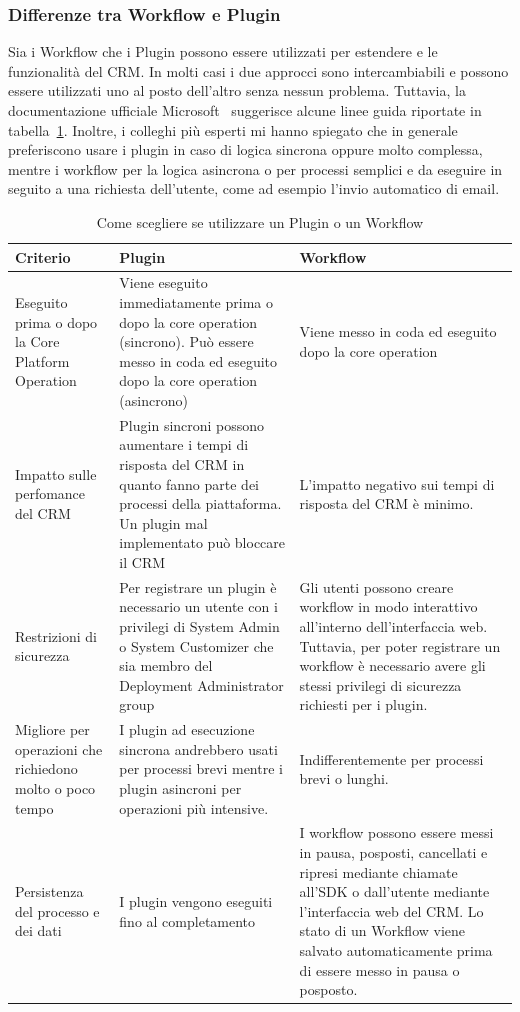 \subsubsection{Differenze tra Workflow e Plugin}
Sia i Workflow che i Plugin possono essere utilizzati per estendere e le funzionalità del CRM. In molti casi i due approcci sono intercambiabili e possono essere utilizzati uno al posto dell'altro senza nessun problema. 
Tuttavia, la documentazione ufficiale Microsoft~\cite{PluginVSWorkflow} suggerisce alcune linee guida riportate in tabella~\ref{table:pluginVsWorkflow}. Inoltre, i colleghi più esperti mi hanno spiegato che in generale preferiscono usare i plugin in caso di logica sincrona oppure molto complessa, mentre i workflow per la logica asincrona o per processi semplici e da eseguire in seguito a una richiesta dell'utente, come ad esempio l'invio automatico di email.

\begin{table}[ht]
  \centering
  \begin{tabular}{p{}p{}p{}}
    \toprule
      \textbf{Criterio} & \textbf{Plugin} & \textbf{Workflow} \\
    \midrule
    Eseguito prima o dopo la Core Platform Operation & Viene eseguito immediatamente prima o dopo la core operation (sincrono). Può essere messo in coda ed eseguito dopo la core operation (asincrono) & Viene messo in coda ed eseguito dopo la core operation \\
    \midrule
    Impatto sulle perfomance del CRM & Plugin sincroni possono aumentare i tempi di risposta del CRM in quanto fanno parte dei processi della piattaforma. Un plugin mal implementato può bloccare il CRM & L'impatto negativo sui tempi di risposta del CRM è minimo. \\
    \midrule
    Restrizioni di sicurezza & Per registrare un plugin è necessario un utente con i privilegi di System Admin o System Customizer che sia membro del Deployment Administrator group & Gli utenti possono creare workflow in modo interattivo all'interno dell'interfaccia web. Tuttavia, per poter registrare un workflow è necessario avere gli stessi privilegi di sicurezza richiesti per i plugin. \\
    \midrule
    Migliore per operazioni che richiedono molto o poco tempo & I plugin ad esecuzione sincrona andrebbero usati per processi brevi mentre i plugin asincroni per operazioni più intensive. & Indifferentemente per processi brevi o lunghi. \\
    \midrule
    Persistenza del processo e dei dati & I plugin vengono eseguiti fino al completamento & I workflow possono essere messi in pausa, posposti, cancellati e ripresi mediante chiamate all'SDK o dall'utente mediante l'interfaccia web del CRM. Lo stato di un Workflow viene salvato automaticamente prima di essere messo in pausa o posposto. \\
    \bottomrule
  \end{tabular}
  \caption{Come scegliere se utilizzare un Plugin o un Workflow}
  \label{table:pluginVsWorkflow}
\end{table}

